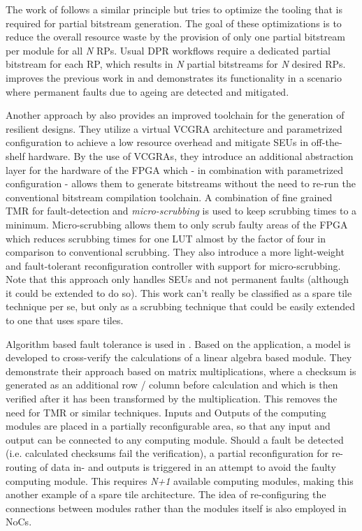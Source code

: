 The work of \cite{martins_tmr_2015} follows a similar principle but tries to optimize the tooling that is required for partial bitstream generation.
The goal of these optimizations is to reduce the overall resource waste by the provision of only one partial bitstream per module for all \textit{N} \glspl{RP}. %
Usual \gls{DPR} workflows require a dedicated partial bitstream for each \gls{RP}, which results in \textit{N} partial bitstreams for \textit{N} desired \glspl{RP}.
\cite{martins_dynamic_2018} improves the previous work in \cite{martins_tmr_2015} and demonstrates its functionality in a scenario where permanent faults due to ageing are detected and mitigated.

Another approach by \cite{kourfali2019} also provides an improved toolchain for the generation of resilient designs. 
They utilize a virtual \gls{VCGRA} architecture and parametrized configuration \cite{heyse2013} to achieve a low resource overhead and mitigate \glspl{SEU} in off-the-shelf hardware.
By the use of \glspl{VCGRA}, they introduce an additional abstraction layer for the hardware of the \gls{FPGA} which - in combination with parametrized configuration - allows them to generate bitstreams without the need to re-run the conventional bitstream compilation toolchain.
A combination of fine grained \gls{TMR} for fault-detection and \textit{micro-scrubbing} is used to keep scrubbing times to a minimum. 
Micro-scrubbing allows them to only scrub faulty areas of the \gls{FPGA} which reduces scrubbing times for one \gls{LUT} almost by the factor of four in comparison to conventional scrubbing.
They also introduce a more light-weight and fault-tolerant reconfiguration controller with support for micro-scrubbing. 
Note that this approach only handles \glspl{SEU} and not permanent faults (although it could be extended to do so).
This work can't really be classified as a spare tile technique per se, but only as a scrubbing technique that could be easily extended to one that uses spare tiles. 

Algorithm based fault tolerance is used in \cite{davis2014}.
Based on the application, a model is developed to cross-verify the calculations of a linear algebra based module. 
They demonstrate their approach based on matrix multiplications, where a checksum is generated as an additional row / column before calculation and which is then verified after it has been transformed by the multiplication.
This removes the need for \gls{TMR} or similar techniques.
Inputs and Outputs of the computing modules are placed in a partially reconfigurable area, so that any input and output can be connected to any computing module.  
Should a fault be detected (i.e. calculated checksums fail the verification), a partial reconfiguration for re-routing of data in- and outputs is triggered in an attempt to avoid the faulty computing module. 
This requires \textit{N+1} available computing modules, making this another example of a spare tile architecture.
The idea of re-configuring the connections between modules rather than the modules itself is also employed in \glspl{NoC}.

